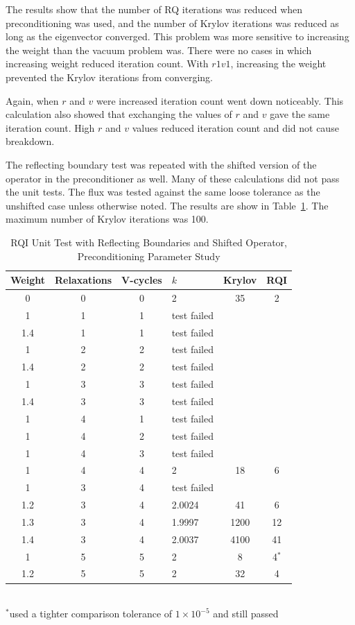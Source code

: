The results show that the number of RQ iterations was reduced when preconditioning was used, and the number of  Krylov iterations was reduced as long as the eigenvector converged. This problem was more sensitive to increasing the weight than the vacuum problem was. There were no cases in which increasing weight reduced iteration count. With $r1v1$, increasing the weight prevented the Krylov iterations from converging. 

Again, when $r$ and $v$ were increased iteration count went down noticeably. This calculation also showed that exchanging the values of $r$ and $v$ gave the same iteration count. High $r$ and $v$ values reduced iteration count and did not cause breakdown. 

The reflecting boundary test was repeated with the shifted version of the operator in the preconditioner as well. Many of these calculations did not pass the unit tests. The flux was tested against the same loose tolerance as the unshifted case unless otherwise noted. The results are show in Table~\ref{table:RQIUnitTestReflShifted}. The maximum number of Krylov iterations was 100.
%
\begin{table}[!h]
\caption{RQI Unit Test with Reflecting Boundaries and Shifted Operator, Preconditioning Parameter Study}
\begin{center}
\begin{tabular}{| c | c | c | l | c | c |}
\hline
Weight & Relaxations & V-cycles & $k$ & Krylov & RQI \\[0.5ex]
\hline
0    & 0 & 0 & 2 & 35 & 2 \\
1    & 1 & 1 & test failed & & \\
1.4 & 1 & 1 & test failed & & \\
1    & 2 & 2 & test failed & & \\
1.4 & 2 & 2 & test failed & & \\
1    & 3 & 3 & test failed & & \\
1.4 & 3 & 3 & test failed & & \\
1    & 4 & 1 & test failed & & \\
1    & 4 & 2 & test failed & & \\
1    & 4 & 3 & test failed & & \\
1    & 4 & 4 & 2 & 18 & 6 \\ 
1    & 3 & 4 & test failed & & \\
1.2 & 3 & 4 & 2.0024 & 41 & 6 \\
1.3 & 3 & 4 & 1.9997 & 1200 & 12 \\
1.4 & 3 & 4 & 2.0037 & 4100 & 41 \\
1    & 5 & 5 & 2 & 8 & 4$^{*}$ \\
1.2 & 5 & 5 & 2& 32 & 4 \\
\hline 
\end{tabular}\\
$^{*}$used a tighter comparison tolerance of $1 \times 10^{-5}$ and still passed
\end{center}
\label{table:RQIUnitTestReflShifted}
\end{table}


